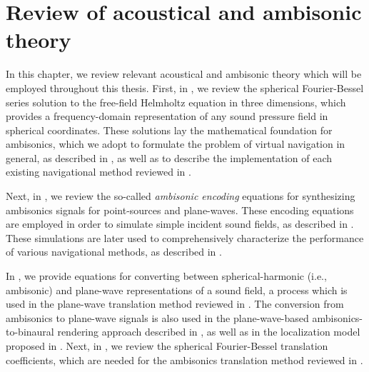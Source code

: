 \chapter{Review of acoustical and ambisonic theory}\label{chap:02_Acoustical_Theory}
In this chapter, we review relevant acoustical and ambisonic theory which will be employed throughout this thesis.
First, in , we review the spherical Fourier-Bessel series solution to the free-field Helmholtz equation in three dimensions, which provides a frequency-domain representation of any sound pressure field in spherical coordinates.
These solutions lay the mathematical foundation for ambisonics, which we adopt to formulate the problem of virtual navigation in general, as described in , as well as to describe the implementation of each existing navigational method reviewed in .

Next, in , we review the so-called \textit{ambisonic encoding} equations for synthesizing ambisonics signals for point-sources and plane-waves.
These encoding equations are employed in order to simulate simple incident sound fields, as described in .
These simulations are later used to comprehensively characterize the performance of various navigational methods, as described in .

In , we provide equations for converting between spherical-harmonic (i.e., ambisonic) and plane-wave representations of a sound field, a process which is used in the plane-wave translation method reviewed in .
The conversion from ambisonics to plane-wave signals is also used in the plane-wave-based ambisonics-to-binaural rendering approach described in , as well as in the localization model proposed in .
Next, in , we review the spherical Fourier-Bessel translation coefficients, which are needed for the ambisonics translation method reviewed in .

